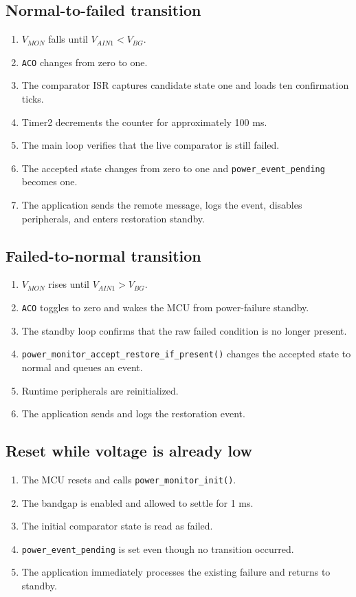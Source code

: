 \documentclass[11pt,a4paper]{article}
\begin{document}
\subsection{Normal-to-failed transition}
\begin{enumerate}
  \item $V_{MON}$ falls until $V_{AIN1}<V_{BG}$.
  \item \texttt{ACO} changes from zero to one.
  \item The comparator ISR captures candidate state one and loads ten confirmation ticks.
  \item Timer2 decrements the counter for approximately 100 ms.
  \item The main loop verifies that the live comparator is still failed.
  \item The accepted state changes from zero to one and \texttt{power\_event\_pending} becomes one.
  \item The application sends the remote message, logs the event, disables peripherals, and enters restoration standby.
\end{enumerate}

\subsection{Failed-to-normal transition}
\begin{enumerate}
  \item $V_{MON}$ rises until $V_{AIN1}>V_{BG}$.
  \item \texttt{ACO} toggles to zero and wakes the MCU from power-failure standby.
  \item The standby loop confirms that the raw failed condition is no longer present.
  \item \texttt{power\_monitor\_accept\_restore\_if\_present()} changes the accepted state to normal and queues an event.
  \item Runtime peripherals are reinitialized.
  \item The application sends and logs the restoration event.
\end{enumerate}

\subsection{Reset while voltage is already low}
\begin{enumerate}
  \item The MCU resets and calls \texttt{power\_monitor\_init()}.
  \item The bandgap is enabled and allowed to settle for 1 ms.
  \item The initial comparator state is read as failed.
  \item \texttt{power\_event\_pending} is set even though no transition occurred.
  \item The application immediately processes the existing failure and returns to standby.
\end{enumerate}
\end{document}
